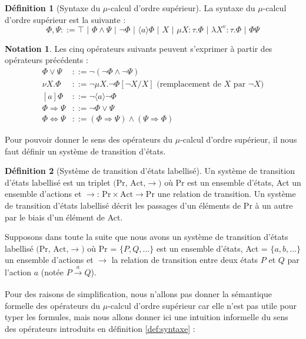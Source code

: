 \documentclass{rapport}
\theoremstyle{plain}
\theoremstyle{remark}
\theoremstyle{definition}
\newtheorem{notat}{Notation}
\newtheorem{dfn}{Définition}
\begin{document}
\begin{dfn}[Syntaxe du $\mu$-calcul d'ordre supérieur] La syntaxe du $\mu$-calcul d'ordre supérieur est la suivante :
\[\Phi, \Psi ::= \top \text{ | } \Phi \wedge \Psi \text{ | } \neg\Phi \text{ | } \langle a \rangle \Phi \text{ | } X \text{ | } \mu X : \tau . \Phi \text{ | } \lambda X^{v} : \tau . \Phi \text{ | } \Phi \Psi\]
\end{dfn}\label{def:syntaxe}

\begin{notat} Les cinq opérateurs suivants peuvent s'exprimer à partir des opérateurs précédents : 
\begin{align*}
	\Phi \vee \Psi &::= \neg (\neg \Phi \wedge \neg \Psi)\\
	\nu X . \Phi &::= \neg \mu X . \neg \Phi [\neg X/X] \text{ (remplacement de } X \text{ par } \neg X)\\
	[a] \Phi &::= \neg \langle a \rangle \neg \Phi\\
	\Phi \Rightarrow \Psi &::= \neg \Phi \vee \Psi\\
	\Phi \Leftrightarrow \Psi &::= (\Phi \Rightarrow \Psi) \wedge (\Psi \Rightarrow \Phi)
\end{align*}
\end{notat}

Pour pouvoir donner le sens des opérateurs du $\mu$-calcul d'ordre supérieur, il nous faut définir un système de transition d'états. 

\begin{dfn}[Système de transition d'états labellisé] Un système de transition d'états labellisé est un triplet $\text{(Pr, Act,} \rightarrow)$ où Pr est un ensemble d'états, Act un ensemble d'actions et ${\rightarrow \text{: Pr} \times \text{Act} \rightarrow \text{Pr}}$ une relation de transition. Un système de transition d'états labellisé décrit les passages d'un éléments de Pr à un autre par le biais d'un élément de Act.  
\end{dfn}

Supposons dans toute la suite que nous avons un système de transition d'états labellisé $\text{(Pr, Act,} \rightarrow)$ où Pr = $\{P, Q, \ldots\}$ est un ensemble d'états, Act = $\{a, b,\ldots\}$ un ensemble d'actions et $\rightarrow$ la relation de transition entre deux états $P$ et $Q$ par l'action $a$ (notée $P\xrightarrow[]{a} Q$).  

Pour des raisons de simplification, nous n'allons pas donner la sémantique formelle des opérateurs du $\mu$-calcul d'ordre supérieur car elle n'est pas utile pour typer les formules, mais nous allons donner ici une intuition informelle du sens des opérateurs introduits en définition \ref{def:syntaxe} :
\end{document}
